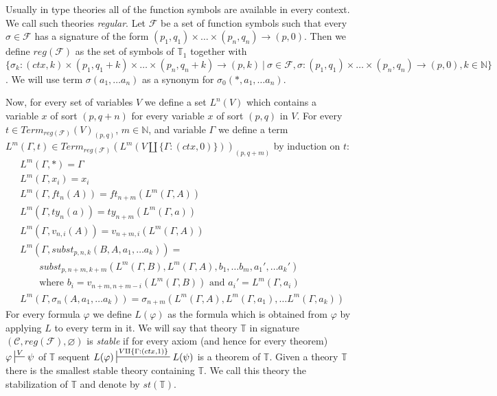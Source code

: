 \documentclass[reqno]{amsart}
\theoremstyle{definition}
\theoremstyle{remark}
\numberwithin{figure}{section}
\begin{document}
Usually in type theories all of the function symbols are available in every context.
We call such theories \emph{regular}.
Let $\mathcal{F}$ be a set of function symbols such that every $\sigma \in \mathcal{F}$ has a signature of the form $(p_1,q_1) \times \ldots \times (p_n,q_n) \to (p,0)$.
Then we define $reg(\mathcal{F})$ as the set of symbols of $\mathbb{T}_1$ together with $\{ \sigma_k : (ctx, k) \times (p_1, q_1 + k) \times \ldots \times (p_n, q_n + k) \to (p, k) \ |\ \sigma \in \mathcal{F}, \sigma : (p_1,q_1) \times \ldots \times (p_n,q_n) \to (p,0), k \in \mathbb{N} \}$.
We will use term $\sigma(a_1, \ldots a_n)$ as a synonym for $\sigma_0(*, a_1, \ldots a_n)$.

Now, for every set of variables $V$ we define a set $L^n(V)$ which contains a variable $x$ of sort $(p,q+n)$ for every variable $x$ of sort $(p,q)$ in $V$.
For every $t \in Term_{reg(\mathcal{F})}(V)_{(p,q)}$, $m \in \mathbb{N}$, and variable $\Gamma$ we define a term $L^m(\Gamma, t) \in Term_{reg(\mathcal{F})}(L^m(V \amalg \{ \Gamma : (ctx,0) \}))_{(p,q+m)}$ by induction on $t$:
\begin{align*}
& L^m(\Gamma, *) = \Gamma \\
& L^m(\Gamma, x_i) = x_i \\
& L^m(\Gamma, ft_n(A)) = ft_{n+m}(L^m(\Gamma, A)) \\
& L^m(\Gamma, ty_n(a)) = ty_{n+m}(L^m(\Gamma, a)) \\
& L^m(\Gamma, v_{n,i}(A)) = v_{n+m,i}(L^m(\Gamma, A)) \\
& L^m(\Gamma, subst_{p,n,k}(B, A, a_1, \ldots a_k)) = \\
& \qquad subst_{p,n+m,k+m}(L^m(\Gamma, B), L^m(\Gamma, A), b_1, \ldots b_m, a_1', \ldots a_k') \\
& \qquad \text{where $b_i = v_{n+m,n+m-i}(L^m(\Gamma, B))$ and $a_i' = L^m(\Gamma, a_i)$ } \\
& L^m(\Gamma, \sigma_n(A, a_1, \ldots a_k)) = \sigma_{n+m}(L^m(\Gamma, A), L^m(\Gamma, a_1), \ldots L^m(\Gamma, a_k))
\end{align*}
For every formula $\varphi$ we define $L(\varphi)$ as the formula which is obtained from $\varphi$ by applying $L$ to every term in it.
We will say that theory $\mathbb{T}$ in signature $(\mathcal{C}, reg(\mathcal{F}), \varnothing)$ is \emph{stable}
if for every axiom (and hence for every theorem) $\varphi \sststile{}{V} \psi$ of $\mathbb{T}$ sequent $L(\varphi) \sststile{}{V \amalg \{ \Gamma : (ctx,1) \}} L(\psi)$ is a theorem of $\mathbb{T}$.
Given a theory $\mathbb{T}$ there is the smallest stable theory containing $\mathbb{T}$.
We call this theory the stabilization of $\mathbb{T}$ and denote by $st(\mathbb{T})$.
\end{document}
